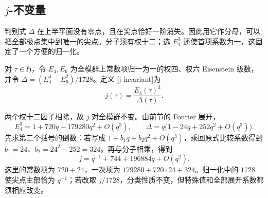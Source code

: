 \subsection{\texorpdfstring{\(j\)}{j}-不变量}
\label{b3:subsec:230602}

判别式 \(\Delta\) 在上半平面没有零点，且在尖点恰好一阶消失。因此用它作分母，可以把全部极点集中到唯一的尖点。分子须有权十二；选 \(E_4^3\) 还使首项系数为一，这固定了一个方便的归一化。

\begin{definition}\label{b3:def:23-j-invariant}
对 \(\tau\in\mathfrak H\)，令 \(E_4,E_6\) 为全模群上常数项归一为一的权四、权六 Eisenstein 级数，并令 \(\Delta=(E_4^3-E_6^2)/1728\)。定义
[j-invariant]为
\[
 j(\tau)=\frac{E_4(\tau)^3}{\Delta(\tau)}.
\]
\end{definition}

两个权十二因子相除，故 \(j\) 对全模群不变。由前节的 Fourier 展开，
\[
 E_4^3=1+720q+179280q^2+O(q^3),\qquad
 \Delta=q\bigl(1-24q+252q^2+O(q^3)\bigr).
\]
先求第二个括号的倒数：若写成 \(1+b_1q+b_2q^2+O(q^3)\)，乘回原式比较系数得到 \(b_1=24\)、\(b_2=24^2-252=324\)。再与分子相乘，得到
\begin{equation}\label{b3:eq:23-j-fourier}
 j=q^{-1}+744+196884q+O(q^2).
\end{equation}
这里的常数项为 \(720+24\)，一次项为 \(179280+720\cdot24+324\)。归一化中的 \(1728\) 使尖点主部恰为 \(q^{-1}\)；若改取 \(j/1728\)，分类性质不变，但特殊值和全部展开系数都须相应改变。

